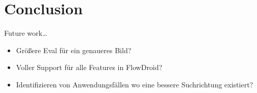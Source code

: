 \documentclass[../draft.tex]{subfiles}
\begin{document}
    \chapter{Conclusion}

    Future work\dots
    \begin{itemize}
        \item Größere Eval für ein genaueres Bild?
        \item Voller Support für alle Features in FlowDroid?
        \item Identifizieren von Anwendungsfällen wo eine bessere Suchrichtung existiert?
    \end{itemize}
\end{document}
